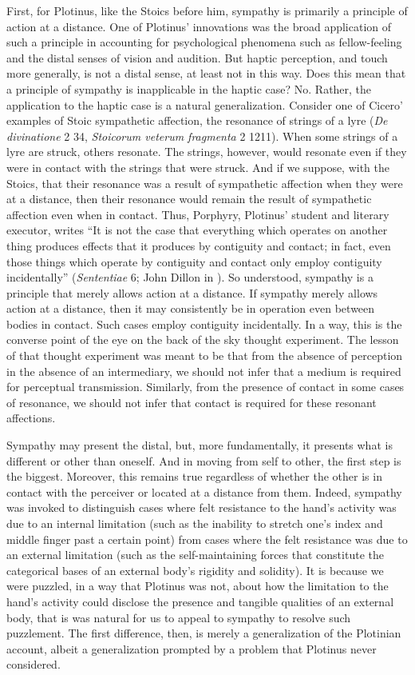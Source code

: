 First, for Plotinus, like the Stoics before him, sympathy is primarily a principle of action at a distance. One of Plotinus' innovations was the broad application of such a principle in accounting for psychological phenomena such as fellow-feeling and the distal senses of vision and audition. But haptic perception, and touch more generally, is not a distal sense, at least not in this way. Does this mean that a principle of sympathy is inapplicable in the haptic case? No. Rather, the application to the haptic case is a natural generalization. Consider one of Cicero' examples of Stoic sympathetic affection, the resonance of strings of a lyre (\emph{De divinatione} 2 34, \emph{Stoicorum veterum fragmenta} 2 1211). When some strings of a lyre are struck, others resonate. The strings, however, would resonate even if they were in contact with the strings that were struck. And if we suppose, with the Stoics, that their resonance was a result of sympathetic affection when they were at a distance, then their resonance would remain the result of sympathetic affection even when in contact. Thus, Porphyry, Plotinus' student and literary executor, writes ``It is not the case that everything which operates on another thing produces effects that it produces by contiguity and contact; in fact, even those things which operate by contiguity and contact only employ contiguity incidentally'' (\emph{Sententiae} 6; John Dillon in \citealt[796]{Brisson:2005qr}). So understood, sympathy is a principle that merely allows action at a distance. If sympathy merely allows action at a distance, then it may consistently be in operation even between bodies in contact. Such cases employ contiguity incidentally. In a way, this is the converse point of the eye on the back of the sky thought experiment. The lesson of that thought experiment was meant to be that from the absence of perception in the absence of an intermediary, we should not infer that a medium is required for perceptual transmission. Similarly, from the presence of contact in some cases of resonance, we should not infer that contact is required for these resonant affections.

Sympathy may present the distal, but, more fundamentally, it presents what is different or other than oneself. And in moving from self to other, the first step is the biggest. Moreover, this remains true regardless of whether the other is in contact with the perceiver or located at a distance from them. Indeed, sympathy was invoked to distinguish cases where felt resistance to the hand's activity was due to an internal limitation (such as the inability to stretch one's index and middle finger past a certain point) from cases where the felt resistance was due to an external limitation (such as the self-maintaining forces that constitute the categorical bases of an external body's rigidity and solidity). It is because we were puzzled, in a way that Plotinus was not, about how the limitation to the hand's activity could disclose the presence and tangible qualities of an external body, that is was natural for us to appeal to sympathy to resolve such puzzlement. The first difference, then, is merely a generalization of the Plotinian account, albeit a generalization prompted by a problem that Plotinus never considered.

